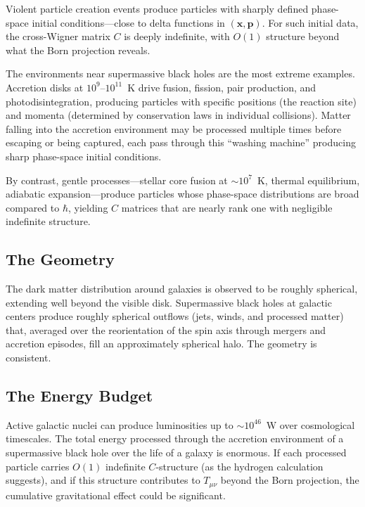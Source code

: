 \documentclass[12pt]{article}
\begin{document}
Violent particle creation events produce particles with sharply defined phase-space initial conditions---close to delta functions in $(\mathbf{x}, \mathbf{p})$.  For such initial data, the cross-Wigner matrix $C$ is deeply indefinite, with $O(1)$ structure beyond what the Born projection reveals.

The environments near supermassive black holes are the most extreme examples.  Accretion disks at $10^9$--$10^{11}$~K drive fusion, fission, pair production, and photodisintegration, producing particles with specific positions (the reaction site) and momenta (determined by conservation laws in individual collisions).  Matter falling into the accretion environment may be processed multiple times before escaping or being captured, each pass through this ``washing machine'' producing sharp phase-space initial conditions.

By contrast, gentle processes---stellar core fusion at $\sim 10^7$~K, thermal equilibrium, adiabatic expansion---produce particles whose phase-space distributions are broad compared to $\hbar$, yielding $C$ matrices that are nearly rank one with negligible indefinite structure.

\subsection{The Geometry}

The dark matter distribution around galaxies is observed to be roughly spherical, extending well beyond the visible disk.  Supermassive black holes at galactic centers produce roughly spherical outflows (jets, winds, and processed matter) that, averaged over the reorientation of the spin axis through mergers and accretion episodes, fill an approximately spherical halo.  The geometry is consistent.

\subsection{The Energy Budget}

Active galactic nuclei can produce luminosities up to $\sim 10^{46}$~W over cosmological timescales.  The total energy processed through the accretion environment of a supermassive black hole over the life of a galaxy is enormous.  If each processed particle carries $O(1)$ indefinite $C$-structure (as the hydrogen calculation suggests), and if this structure contributes to $T_{\mu\nu}$ beyond the Born projection, the cumulative gravitational effect could be significant.
\end{document}
